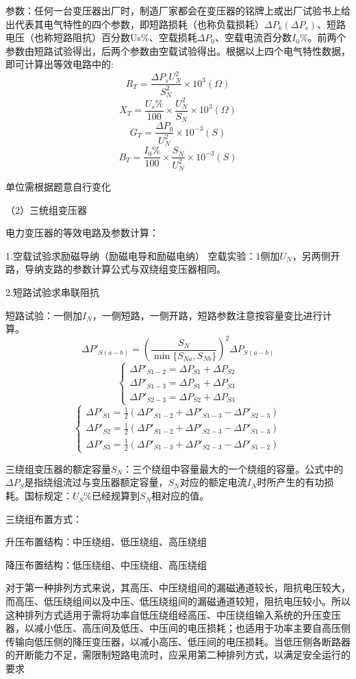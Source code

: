 \documentclass[UTF8, 12pt, a4paper]{ctexart}
\begin{document}
参数：任何一台变压器出厂时，制造厂家都会在变压器的铭牌上或出厂试验书上给出代表其电气特性的四个参数，即短路损耗（也称负载损耗）$\Delta P_k(\Delta P_s)$、短路电压（也称短路阻抗）百分数Us\%、空载损耗$\Delta P_0$、空载电流百分数$I_0$\%。前两个参数由短路试验得出，后两个参数由空载试验得出。根据以上四个电气特性数据，即可计算出等效电路中的:
\[R_T=\frac{\Delta P_sU^2_N}{S_N^2}\times{10}^3(\Omega)\]
\[X_T=\frac{U_s\%}{100}\times\frac{U_N^2}{S_N}\times{10}^3(\Omega)\]
\[G_T=\frac{\Delta P_0}{U^2_N}\times{10}^{-3}(S)\]
\[B_T=\frac{I_0\%}{100}\times\frac{S_N}{U_N^2}\times{10}^{-3}(S)\]

单位需根据题意自行变化

（2）三统组变压器

电力变压器的等效电路及参数计算：

1.空载试验求励磁导纳（励磁电导和励磁电纳）
空载实验：1侧加$U_N$，另两侧开路，导纳支路的参数计算公式与双绕组变压器相同。

2.短路试验求串联阻抗

短路试验：一侧加$I_N$，一侧短路，一侧开路，短路参数注意按容量变比进行计算。
\[\Delta P'_{S(a-b)}=(\frac{S_N}{\min{\{S_{Na},S_{Nb}}\}})^2\Delta P_{S(a-b)}\]
$$\begin{cases}
    \Delta P'_{S1-2}=\Delta P_{S1}+\Delta P_{S2}\\
    \Delta P'_{S1-3}=\Delta P_{S1}+\Delta P_{S3}\\
    \Delta P'_{S2-3}=\Delta P_{S2}+\Delta P_{S3}
\end{cases} 
$$
$$
\begin{cases}
    \Delta P'_{S1}=\frac{1}{2}(\Delta P'_{S1-2}+\Delta P'_{S1-3} - \Delta P'_{S2-3})\\
    \Delta P'_{S2}=\frac{1}{2}(\Delta P'_{S1-2}+\Delta P'_{S2-3} - \Delta P'_{S1-3})\\
    \Delta P'_{S3}=\frac{1}{2}(\Delta P'_{S1-3}+\Delta P'_{S2-3} - \Delta P'_{S1-2})
\end{cases}
$$

三绕组变压器的额定容量$S_N$：三个绕组中容量最大的一个绕组的容量。公式中的$\Delta P_S$是指绕组流过与变压器额定容量，$S_N$对应的额定电流$I_N$时所产生的有功损耗。国标规定：$U_S$\%已经规算到$S_N$相对应的值。

三绕组布置方式：

升压布置结构：中压绕组、低压绕组、高压绕组

降压布置结构：低压绕组、中压绕组、高压绕组

对于第一种排列方式来说，其高压、中压绕组间的漏磁通道较长，阻抗电压较大，而高压、低压绕组间以及中压、低压绕组间的漏磁通道较短，阻抗电压较小。所以这种排列方式适用于需将功率自低压绕组经高压、中压绕组输入系统的升压变压器，以减小低压、高压间及低压、中压间的电压损耗；也适用于功率主要自高压侧传输向低压侧的降压变压器，以减小高压、低压间的电压损耗。当低压侧各断路器的开断能力不足，需限制短路电流时，应采用第二种排列方式，以满足安全运行的要求
\end{document}
